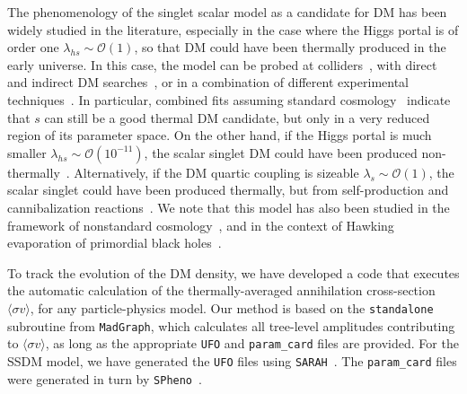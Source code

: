 \documentclass[a4paper,11pt]{article}
\newcommand{\lhs}{\lambda_{hs}}
\newcommand{\sv}{\langle\sigma v\rangle}
\begin{document}
The phenomenology of the singlet scalar model as a candidate for DM has been widely studied in the literature, especially in the case where the Higgs portal is of order one $\lhs \sim \mathcal{O}(1)$, so that DM could have been thermally produced in the early universe.
In this case, the model can be probed at colliders~\cite{Barger:2007im, Kanemura:2011nm, Djouadi:2011aa, No:2013wsa, Craig:2014lda, Robens:2015gla, Han:2016gyy, Ruhdorfer:2019utl, Englert:2020gcp, Garcia-Abenza:2020xkk, Biekotter:2022ckj}, with direct and indirect DM searches~\cite{Yaguna:2008hd, Goudelis:2009zz, Profumo:2010kp, Urbano:2014hda, Duerr:2015mva, DiMauro:2023tho}, or in a combination of different experimental techniques~\cite{He:2009yd, Djouadi:2012zc, Damgaard:2013kva, Baek:2014jga, Curtin:2014jma, Feng:2014vea, Han:2015hda, Duerr:2015aka, Benito:2016kyp, GAMBIT:2018eea}. In particular, combined fits assuming standard cosmology~\cite{Cline:2013gha, Beniwal:2015sdl, GAMBIT:2017gge, Athron:2018ipf} indicate that $s$ can still be a good thermal DM candidate, but only in a very reduced region of its parameter space.
On the other hand, if the Higgs portal is much smaller $\lhs \sim \mathcal{O}(10^{-11})$, the scalar singlet DM could have been produced non-thermally~\cite{Yaguna:2011qn, Yaguna:2011ei, Campbell:2015fra, Kang:2015aqa, Belanger:2018ccd, Bernal:2018kcw, Heeba:2018wtf, Huo:2019bjf, Lebedev:2019ton, Cosme:2023xpa}.
Alternatively, if the DM quartic coupling is sizeable $\lambda_s \sim \mathcal{O}(1)$, the scalar singlet could have been produced thermally, but from self-production and cannibalization reactions~\cite{Carlson:1992fn, Bernal:2015xba, Heikinheimo:2017ofk, Arcadi:2019oxh, Bernal:2020gzm}.
We note that this model has also been studied in the framework of nonstandard cosmology~\cite{Yaguna:2011ei, Bernal:2018ins, Hardy:2018bph, Bernal:2018kcw, Allahverdi:2020bys}, and in the context of Hawking evaporation of primordial black holes~\cite{Bernal:2020bjf}.

To track the evolution of the DM density, we have developed a code that executes the automatic calculation of the thermally-averaged annihilation cross-section $\sv$, for any particle-physics model.
Our method is based on the \texttt{standalone} subroutine from \texttt{MadGraph}, which calculates all tree-level amplitudes contributing to $\sv$, as long as the appropriate \texttt{UFO} and \texttt{param\_card} files are provided. For the SSDM model, we have generated the \texttt{UFO} files using \texttt{SARAH}~\cite{Staub:2008uz, Staub:2012pb, Staub:2013tta}. The \texttt{param\_card} files were generated in turn by \texttt{SPheno}~\cite{Porod:2003um, Porod:2011nf, Staub:2011dp}. 
\end{document}
